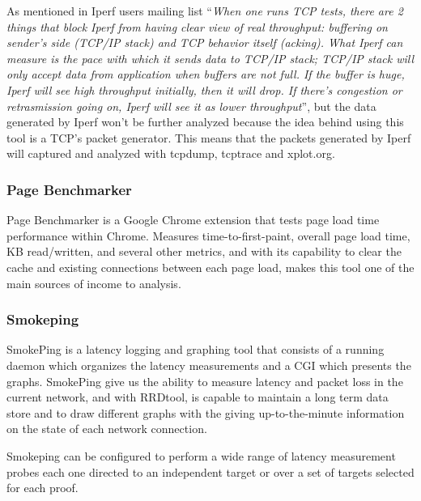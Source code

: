 As mentioned in Iperf users mailing list ``\emph{When one runs TCP tests,
there are 2 things that block Iperf from having clear view of real throughput:
buffering on sender's side (TCP/IP stack) and TCP behavior itself (acking).
What Iperf can measure is the pace with which it sends data to TCP/IP stack;
TCP/IP stack will only accept data from application when buffers are not full.
If the buffer is huge, Iperf will see high throughput initially, then it will
drop. If there's congestion or retrasmission going on, Iperf will see it as
lower throughput}''\cite{iperfmaillist}, but the data generated by Iperf won't
be further analyzed because the  idea behind using this tool is a TCP's packet
generator. This means that the packets generated by  Iperf will captured and
analyzed with tcpdump, tcptrace and xplot.org.

\subsubsection{Page Benchmarker}
Page Benchmarker is a Google Chrome extension that tests page load 
time performance within Chrome. Measures time-to-first-paint, overall page load 
time, KB read/written, and several other metrics, and with its capability to 
clear the cache and existing connections between each page load, makes this 
tool one of the main sources of income to analysis.

\subsubsection{Smokeping}
SmokePing is a latency logging and graphing tool that consists of a running 
daemon which organizes the latency measurements and a CGI which presents the 
graphs. SmokePing give us the ability to measure latency and packet loss 
in the current network, and with RRDtool, is capable to maintain a long term 
data store and to draw different graphs with the giving up-to-the-minute 
information on the state of each network connection.

Smokeping can be configured to perform a wide range of latency measurement 
probes each one directed to an independent target or over a set of targets 
selected for each proof.
